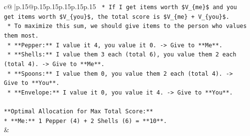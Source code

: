 \documentclass{article}
\begin{document}
{\begin{supertabular}{c@{$\;$}|p{.15\linewidth}@{}p{.15\linewidth}p{.15\linewidth}p{.15\linewidth}p{.15\linewidth}p{.15\linewidth}}
{{{\texttt{    *   If I get items worth \$V\_\{me\}\$ and you get items worth \$V\_\{you\}\$, the total score is \$V\_\{me\} + V\_\{you\}\$.} \\
\texttt{    *   To maximize this sum, we should give items to the person who values them most.} \\
\texttt{    *   **Pepper:** I value it 4, you value it 0. {-}> Give to **Me**.} \\
\texttt{    *   **Shells:** I value them 3 each (total 6), you value them 2 each (total 4). {-}> Give to **Me**.} \\
\texttt{    *   **Spoons:** I value them 0, you value them 2 each (total 4). {-}> Give to **You**.} \\
\texttt{    *   **Envelope:** I value it 0, you value it 4. {-}> Give to **You**.} \\
\\ 
\texttt{**Optimal Allocation for Max Total Score:**} \\
\texttt{*   **Me:** 1 Pepper (4) + 2 Shells (6) = **10**.} \\
            }
        }
    }
    & \\ \\


\end{supertabular}}
\end{document}
